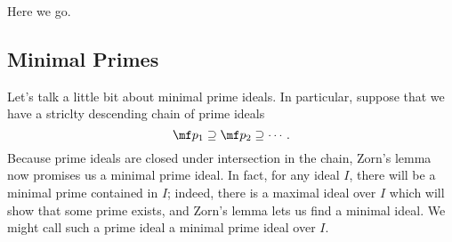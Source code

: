 
Here we go.

\subsection{Minimal Primes}

Let's talk a little bit about minimal prime ideals. In particular, suppose that we have a striclty descending chain of prime ideals
\[\mf p_1\supseteq\mf p_2\supseteq\cdots.\]
Because prime ideals are closed under intersection in the chain, Zorn's lemma now promises us a minimal prime ideal. In fact, for any ideal $I$, there will be a minimal prime contained in $I$; indeed, there is a maximal ideal over $I$ which will show that some prime exists, and Zorn's lemma lets us find a minimal ideal.
We might call such a prime ideal a minimal prime ideal over $I$.

